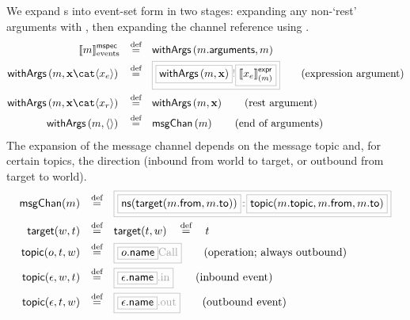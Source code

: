 \begin{definition}

We expand \mmessagespec s into event-set form in two stages: expanding
any non-`rest' arguments with , then expanding the channel
reference using .
%
\begin{align*}
	\emspecsema{\amspec}
\quad\defeq\quad&
\funcname{withArgs}\left(\field{\amspec}{arguments}, \amspec\right)
\\
	\funcname{withArgs}\left(\amspec, \anarglist\cat\langle\anexprarg\rangle\right)
\quad\defeq\quad&
\tlang{
	\olang{\funcname{withArgs}\left(\amspec, \anarglist\right)}
	!\olang{\exprsema{\anexprarg}{\amspec}}
}
\tag{expression argument}
\\
	\funcname{withArgs}\left(\amspec, \anarglist\cat\langle\arestarg\rangle\right)
\quad\defeq\quad&
	\funcname{withArgs}\left(\amspec, \anarglist\right)
\tag{rest argument}
\\
	\funcname{withArgs}\left(\amspec, \langle\rangle\right)
\quad\defeq\quad&
	\funcname{msgChan}\left(\amspec\right)
\tag{end of arguments}
\end{align*}
The expansion of the message channel
depends on the message topic
and, for certain topics, the direction (inbound from world to target, or
outbound from target to world).
\newcommand{\nsOf}[1]{\mathsf{ns}(#1)}
\newcommand{\targetOf}[2]{\mathsf{target}(#1,#2)}
\newcommand{\topicOf}[3]{\mathsf{topic}(#1,#2,#3)}
%
\begin{align*}
	\funcname{msgChan}(\amspec)
\quad\defeq\quad&
\tlang{
	\olang{\nsOf{\targetOf{\field{\amspec}{from}}{\field{\amspec}{to}}}}
	{}\cspnsop{}
	\olang{\topicOf{\field{\amspec}{topic}}{\field{\amspec}{from}}{\field{\amspec}{to}}}
}
\\
	\targetOf{\aworld}{\atarget}
\quad\defeq\quad&
	\targetOf{\atarget}{\aworld}
	\quad\defeq\quad
	\atarget
\\
	\topicOf{\anop}{\atarget}{\aworld}
\quad\defeq\quad&
\tlang{
	\olang{\field{\anop}{name}}\text{Call}
}
\tag{operation; always outbound}
\\
	\topicOf{\anevent}{\aworld}{\atarget}
\quad\defeq\quad&
	\tlang{\olang{\field{\anevent}{name}}\text{.in}}
\tag{inbound event}
\\
	\topicOf{\anevent}{\atarget}{\aworld}
\quad\defeq\quad&
	\tlang{\olang{\field{\anevent}{name}}\text{.out}}
\tag{outbound event}
\end{align*}
\end{definition}


